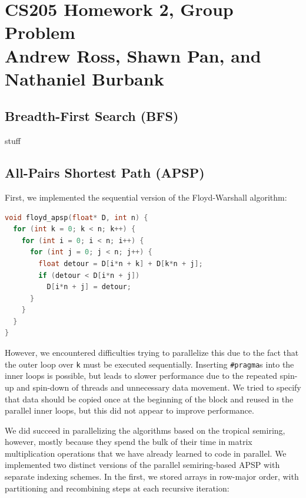 \documentclass[12pt]{article}
\newcommand*{\ttfamilywithbold}{\fontfamily{lmtt}\selectfont}
\begin{document}
\section*{CS205 Homework 2, Group Problem\\ \small Andrew Ross, Shawn Pan, and Nathaniel Burbank}

\subsection*{Breadth-First Search (BFS)}

stuff

\subsection*{All-Pairs Shortest Path (APSP)}

First, we implemented the sequential version of the Floyd-Warshall algorithm:

\begin{lstlisting}[language=C,basicstyle=\ttfamilywithbold\footnotesize]
void floyd_apsp(float* D, int n) {
  for (int k = 0; k < n; k++) {
    for (int i = 0; i < n; i++) {
      for (int j = 0; j < n; j++) {
        float detour = D[i*n + k] + D[k*n + j];
        if (detour < D[i*n + j])
          D[i*n + j] = detour;
      }
    }
  }
}
\end{lstlisting}

However, we encountered difficulties trying to parallelize this due to the fact that the outer loop over \texttt{k} must be executed sequentially. Inserting \texttt{\#pragma}s into the inner loops is possible, but leads to slower performance due to the repeated spin-up and spin-down of threads and unnecessary data movement. We tried to specify that data should be copied once at the beginning of the block and reused in the parallel inner loops, but this did not appear to improve performance.

We did succeed in parallelizing the algorithms based on the tropical semiring, however, mostly because they spend the bulk of their time in matrix multiplication operations that we have already learned to code in parallel. We implemented two distinct versions of the parallel semiring-based APSP with separate indexing schemes. In the first, we stored arrays in row-major order, with partitioning and recombining steps at each recursive iteration:
\end{document}
